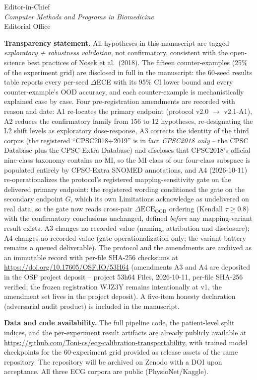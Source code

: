 \documentclass[11pt,letterpaper]{letter}
\begin{document}
\begin{letter}{Editor-in-Chief\\
\emph{Computer Methods and Programs in Biomedicine}\\
Editorial Office}
\bigskip

\textbf{Transparency statement.}
All hypotheses in this manuscript are tagged
\emph{exploratory + robustness validation}, not confirmatory,
consistent with the open-science best practices of
Nosek et al.\ (2018). The fifteen counter-examples (25\% of the
experiment grid) are disclosed in full in the manuscript: the 60-seed
results table reports every per-seed $\Delta$ECE with its 95\% CI
lower bound and every counter-example's OOD accuracy, and each
counter-example is mechanistically explained case by case. Four
pre-registration amendments are recorded with
reason and date: A1 re-locates the primary endpoint (protocol
v2.0 $\rightarrow$ v2.1-A1), A2 reduces the confirmatory family
from 156 to 12 hypotheses, re-designating the L2 shift levels as
exploratory dose-response, A3 corrects the identity of the third
corpus (the registered ``CPSC2018+2019'' is in fact \emph{CPSC2018
only} -- the CPSC Database plus the CPSC-Extra Database) and discloses
that CPSC2018's official nine-class taxonomy contains no MI, so the MI
class of our four-class subspace is populated entirely by CPSC-Extra
SNOMED annotations, and A4 (2026-10-11) re-operationalizes the
protocol's registered mapping-sensitivity gate on the delivered primary
endpoint: the registered wording conditioned the gate on the secondary
endpoint $G$, which its own Limitations acknowledge as undelivered on
real data, so the gate now reads cross-pair $\Delta\text{ECE}_{\text{OOD}}$
ordering (Kendall $\tau\geq0.8$) with the confirmatory conclusions
unchanged, defined \emph{before} any mapping-variant result exists. A3
changes no recorded value (naming, attribution and disclosure); A4
changes no recorded value (gate operationalization only; the variant
battery remains a queued deliverable). The protocol and the
amendments are archived as an immutable record with per-file
SHA-256 checksums at \url{https://doi.org/10.17605/OSF.IO/53H64}
(amendments A3 and A4 are deposited in the OSF project deposit --
project 53h64 Files, 2026-10-11, per-file SHA-256 verified; the frozen
registration WJZ3Y remains intentionally at v1, the amendment set lives
in the project deposit).
A five-item honesty declaration (adversarial audit product) is
included in the manuscript.

\bigskip

\textbf{Data and code availability.}
The full pipeline code, the patient-level split indices, and the
per-experiment result artifacts are already publicly available at
\url{https://github.com/Toni-cs/ecg-calibration-transportability},
with trained model checkpoints for the 60-experiment grid provided as
release assets of the same repository. The repository will be archived
on Zenodo with a DOI upon acceptance. All three ECG corpora are public
(PhysioNet/Kaggle).


\end{letter}
\end{document}
